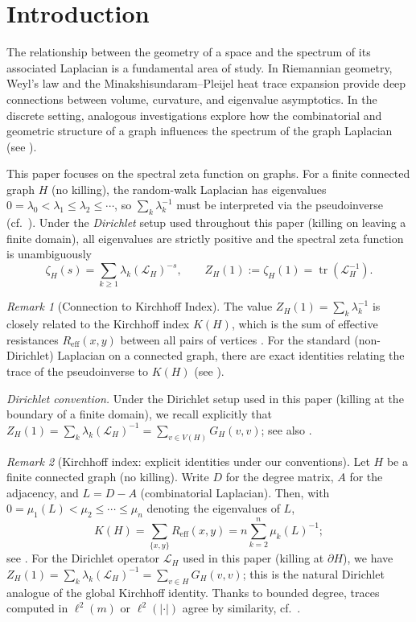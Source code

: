 \documentclass[reqno]{amsart}
\numberwithin{equation}{section}
\theoremstyle{definition}
\theoremstyle{remark}
\newtheorem{remark}[remark]{Remark}
\DeclareMathOperator{\tr}{tr}
\newcommand{\LL}{\mathcal{L}}
\newcommand{\Reff}{R_{\mathrm{eff}}}
\begin{document}
\maketitle
\section{Introduction}

The relationship between the geometry of a space and the spectrum of its associated Laplacian is a fundamental area of study. In Riemannian geometry, Weyl's law and the Minakshisundaram--Pleijel heat trace expansion provide deep connections between volume, curvature, and eigenvalue asymptotics. In the discrete setting, analogous investigations explore how the combinatorial and geometric structure of a graph influences the spectrum of the graph Laplacian (see \cite{Chung97}).

This paper focuses on the spectral zeta function on graphs. For a finite connected graph $H$ (no killing), the random-walk Laplacian has eigenvalues $0=\lambda_0 < \lambda_1 \leq \lambda_2 \leq \cdots$, so $\sum_k \lambda_k^{-1}$ must be interpreted via the pseudoinverse (cf.\ ). Under the \emph{Dirichlet} setup used throughout this paper (killing on leaving a finite domain), all eigenvalues are strictly positive and the spectral zeta function is unambiguously
\[
  \zeta_H(s)=\sum_{k\ge1}\lambda_k(\LL_H)^{-s},\qquad Z_H(1):=\zeta_H(1)=\tr(\LL_H^{-1}).
\]

\begin{remark}[Connection to Kirchhoff Index]\label{rem:kirchhoff}
The value $Z_H(1) = \sum_k \lambda_k^{-1}$ is closely related to the Kirchhoff index $K(H)$, which is the sum of effective resistances $\Reff(x,y)$ between all pairs of vertices \cite{KleinRandic93}. For the standard (non-Dirichlet) Laplacian on a connected graph, there are exact identities relating the trace of the pseudoinverse to $K(H)$ (see \cite[Chapter 9]{LyonsPeres16}).
\end{remark}

\noindent\textit{Dirichlet convention.} Under the Dirichlet setup used in this paper (killing at the boundary of a finite domain),
we recall explicitly that
$Z_H(1)=\sum_k \lambda_k(\LL_H)^{-1}=\sum_{v\in V(H)} G_H(v,v)$; see also .

\begin{remark}[Kirchhoff index: explicit identities under our conventions]\label{rem:kirchhoff-precise}
Let $H$ be a finite connected graph (no killing). Write $D$ for the degree matrix, $A$ for the adjacency, and $L=D-A$ (combinatorial Laplacian). Then, with $0=\mu_1(L)<\mu_2\le\cdots\le\mu_n$ denoting the eigenvalues of $L$,
\[
  K(H)=\sum_{\{x,y\}}\Reff(x,y)=n\sum_{k=2}^n \mu_k(L)^{-1};
\]
see \cite[Thm.~9.23]{LyonsPeres16}. For the Dirichlet operator $\LL_H$ used in this paper (killing at $\partial H$), we have $Z_H(1)=\sum_k\lambda_k(\LL_H)^{-1}=\sum_{v\in H}G_H(v,v)$; this is the natural Dirichlet analogue of the global Kirchhoff identity. Thanks to bounded degree, traces computed in $\ell^2(m)$ or $\ell^2(|\cdot|)$ agree by similarity, cf.\ .
\end{remark}
\end{document}
